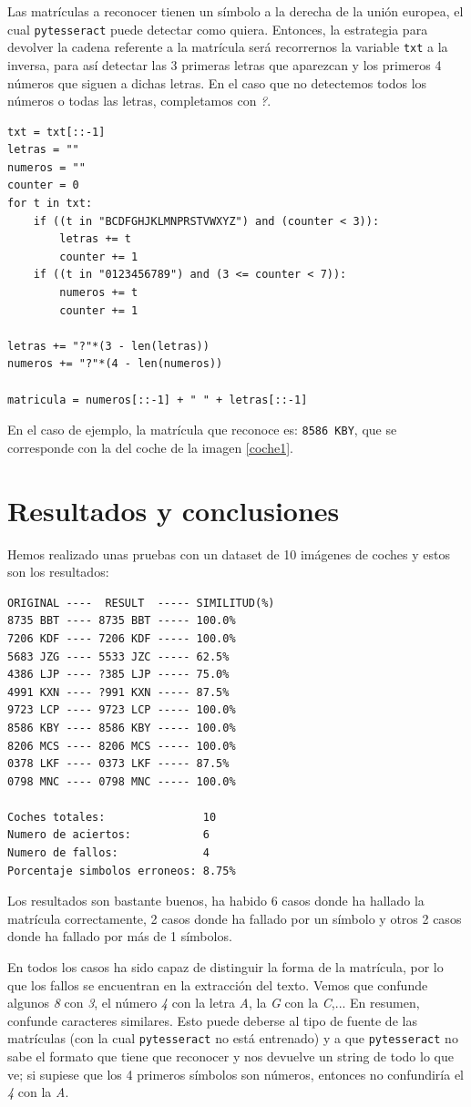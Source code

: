 Las matrículas a reconocer tienen un símbolo a la derecha de la unión europea, el cual \texttt{pytesseract} puede detectar como quiera. Entonces, la estrategia para devolver la cadena referente a la matrícula será recorrernos la variable \texttt{txt} a la inversa, para así detectar las 3 primeras letras que aparezcan y los primeros 4 números que siguen a dichas letras. En el caso que no detectemos todos los números o todas las letras, completamos con \textit{?}.
\begin{verbatim}
txt = txt[::-1]
letras = ""
numeros = ""
counter = 0
for t in txt:
    if ((t in "BCDFGHJKLMNPRSTVWXYZ") and (counter < 3)):
        letras += t
        counter += 1
    if ((t in "0123456789") and (3 <= counter < 7)):
        numeros += t
        counter += 1

letras += "?"*(3 - len(letras)) 
numeros += "?"*(4 - len(numeros)) 
        
matricula = numeros[::-1] + " " + letras[::-1]
\end{verbatim}

En el caso de ejemplo, la matrícula que reconoce es: \texttt{8586 KBY}, que se corresponde con la del coche de la imagen \ref{coche1}.

\section{Resultados y conclusiones}
Hemos realizado unas pruebas con un dataset de 10 imágenes de coches y estos son los resultados:
\begin{verbatim}
ORIGINAL ----  RESULT  ----- SIMILITUD(%)
8735 BBT ---- 8735 BBT ----- 100.0%
7206 KDF ---- 7206 KDF ----- 100.0%
5683 JZG ---- 5533 JZC ----- 62.5%
4386 LJP ---- ?385 LJP ----- 75.0%
4991 KXN ---- ?991 KXN ----- 87.5%
9723 LCP ---- 9723 LCP ----- 100.0%
8586 KBY ---- 8586 KBY ----- 100.0%
8206 MCS ---- 8206 MCS ----- 100.0%
0378 LKF ---- 0373 LKF ----- 87.5%
0798 MNC ---- 0798 MNC ----- 100.0%

Coches totales:               10
Numero de aciertos:           6
Numero de fallos:             4
Porcentaje simbolos erroneos: 8.75%
\end{verbatim}

Los resultados son bastante buenos, ha habido 6 casos donde ha hallado la matrícula correctamente, 2 casos donde ha fallado por un símbolo y otros 2 casos donde ha fallado por más de 1 símbolos.

En todos los casos ha sido capaz de distinguir la forma de la matrícula, por lo que los fallos se encuentran en la extracción del texto. Vemos que confunde algunos \textit{8} con \textit{3}, el número \textit{4} con la letra \textit{A}, la \textit{G} con la \textit{C},... En resumen, confunde caracteres similares. Esto puede deberse al tipo de fuente de las matrículas (con la cual \texttt{pytesseract} no está entrenado) y a que \texttt{pytesseract} no sabe el formato que tiene que reconocer y nos devuelve un string de todo lo que ve; si supiese que los 4 primeros símbolos son números, entonces no confundiría el \textit{4} con la \textit{A}.

